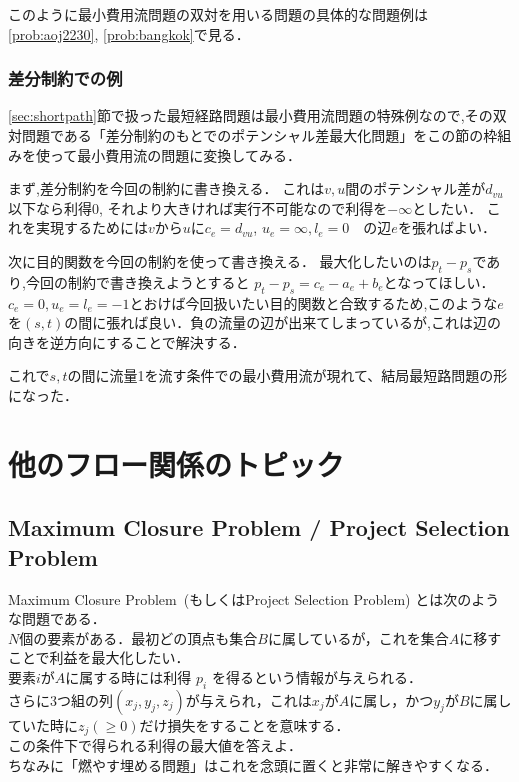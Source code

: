 \documentclass[13pt]{jarticle}
\theoremstyle{nonitalic} %
\begin{document}
このように最小費用流問題の双対を用いる問題の具体的な問題例は \ref{prob:aoj2230}, \ref{prob:bangkok}で見る．

\subsubsection{差分制約での例}
\ref{sec:shortpath}節で扱った最短経路問題は最小費用流問題の特殊例なので,その双対問題である「差分制約のもとでのポテンシャル差最大化問題」をこの節の枠組みを使って最小費用流の問題に変換してみる．

まず,差分制約を今回の制約に書き換える．
これは$v,u$間のポテンシャル差が$d_{vu}$以下なら利得0, それより大きければ実行不可能なので利得を$-\infty$としたい．
これを実現するためには$v$から$u$に$c_e=d_{vu}$, $u_e=\infty, l_e=0$　の辺$e$を張ればよい．

次に目的関数を今回の制約を使って書き換える．
最大化したいのは$p_t-p_s$であり,今回の制約で書き換えようとすると
$p_t-p_s = c_e - a_e + b_e$となってほしい．$c_e=0, u_e=l_e=-1$とおけば今回扱いたい目的関数と合致するため,このような$e$を$(s,t)$の間に張れば良い．負の流量の辺が出来てしまっているが,これは辺の向きを逆方向にすることで解決する．

これで$s,t$の間に流量1を流す条件での最小費用流が現れて、結局最短路問題の形になった．

\section{他のフロー関係のトピック}
\subsection{Maximum Closure Problem / Project Selection Problem}
Maximum Closure Problem~(もしくはProject Selection Problem) とは次のような問題である．\\

$N$個の要素がある．最初どの頂点も集合$B$に属しているが，これを集合$A$に移すことで利益を最大化したい． \\
要素$i$が$A$に属する時には利得 $p_i$ を得るという情報が与えられる． \\
さらに3つ組の列$(x_j, y_j, z_j)$が与えられ，これは$x_j$が$A$に属し，かつ$y_j$が$B$に属していた時に$z_j(\geq 0)$だけ損失をすることを意味する． \\
この条件下で得られる利得の最大値を答えよ． \\

ちなみに「燃やす埋める問題」はこれを念頭に置くと非常に解きやすくなる．
\end{document}
